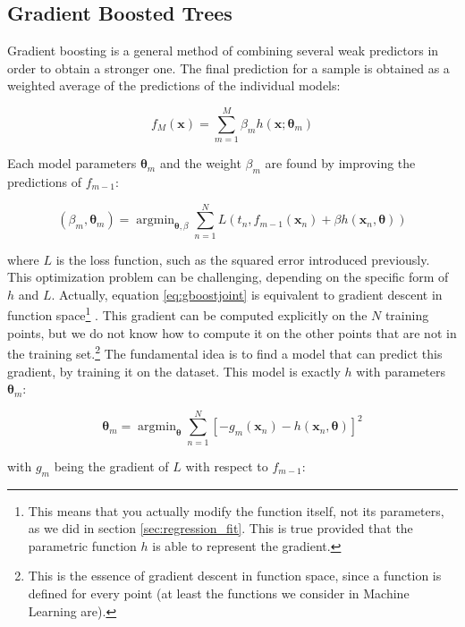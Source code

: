 \documentclass[a4paper,11pt]{kth-mag}
\DeclareMathOperator*{\argmin}{argmin}
\begin{document}
\subsection{Gradient Boosted Trees}
Gradient boosting \citep{gradientboosting} is a general method of combining several weak predictors in order to obtain a stronger one. The final prediction for a sample is obtained as a weighted average of the predictions of the individual models:

\begin{equation}
\label{eq:gboost}
f_M(\bm x)=\sum_{m=1}^M \beta_m h(\bm x;\bm\theta_m)
\end{equation}

Each model parameters $\bm\theta_m$ and the weight $\beta_m$ are found by improving the predictions of $f_{m-1}$:

\begin{equation}
\label{eq:gboostjoint}
(\beta_m, \bm\theta_m)=\argmin_{\bm\theta,\beta}\sum_{n=1}^N L\left(
t_n, f_{m-1}(\bm x_n)+\beta h(\bm x_n,\bm\theta)
\right)
\end{equation}

\noindent where $L$ is the loss function, such as the squared error introduced previously. This optimization problem can be challenging, depending on the specific form of $h$ and $L$. Actually, equation \ref{eq:gboostjoint} is equivalent to gradient descent in function space\footnote{This means that you actually modify the function itself, not its parameters, as we did in section \ref{sec:regression_fit}. This is true provided that the parametric function $h$ is able to represent the gradient.} \citep{boostinggd,greedyboosting}. This gradient can be computed explicitly on the $N$ training points, but we do not know how to compute it on the other points that are not in the training set.\footnote{This is the essence of gradient descent in function space, since a function is defined for every point (at least the functions we consider in Machine Learning are).} The fundamental idea is to find a model that can predict this gradient, by training it on the dataset. This model is exactly $h$ with parameters $\bm\theta_m$:

\begin{equation}
\label{eq:gbtheta}
\bm\theta_m=\argmin_{\bm\theta}\sum_{n=1}^N \left[
-g_m(\bm x_n)-h(\bm x_n,\bm\theta)
\right]^2
\end{equation}

\noindent with $g_m$ being the gradient of $L$ with respect to $f_{m-1}$:
\end{document}
